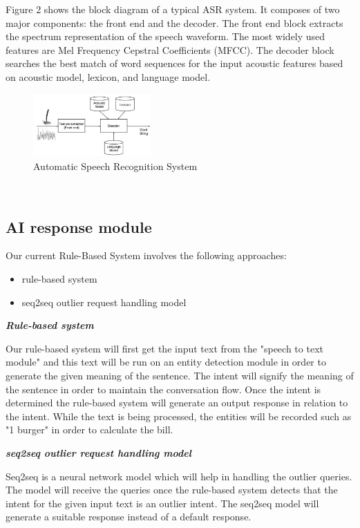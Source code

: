 \documentclass[conference]{IEEEtran}
\begin{document}
Figure 2 shows the block diagram of a typical ASR system. It composes of two major components: the front end and the decoder. The front end block extracts the spectrum representation of the speech waveform. The most widely used features are Mel Frequency Cepstral Coefficients (MFCC)\cite{b2}. The decoder block searches the best match of word sequences for the input acoustic features based on acoustic model, lexicon, and language model. 
\begin{figure}[!ht]
	\centering
	\includegraphics[width=0.4\textwidth]{ASR.png}
	\caption{Automatic Speech Recognition System\cite{b3}}
\end{figure}\\
\subsection{\textbf{AI response module}}
Our current Rule-Based System involves the following approaches:
\begin{itemize}
	\item rule-based system
	\item seq2seq outlier request handling model
\end{itemize}

\bigskip

\textbf{\textit{Rule-based system}}

\bigskip

Our rule-based system will first get the input text from the "speech to text module" and this text will be run on an entity detection module in order to generate the given meaning of the sentence. The intent will signify the meaning of the sentence in order to maintain the conversation flow. Once the intent is determined the rule-based system will generate an output response in relation to the intent. While the text is being processed, the entities will be recorded such as "1 burger" in order to calculate the bill.

\bigskip

\textbf{\textit{seq2seq outlier request handling model\cite{b5}}}

Seq2seq is a neural network model\cite{b5} which will help in handling the outlier queries. The model will receive the queries once the rule-based system detects that the intent for the given input text is an outlier intent. The seq2seq model will generate a suitable response instead of a default response.
\end{document}
